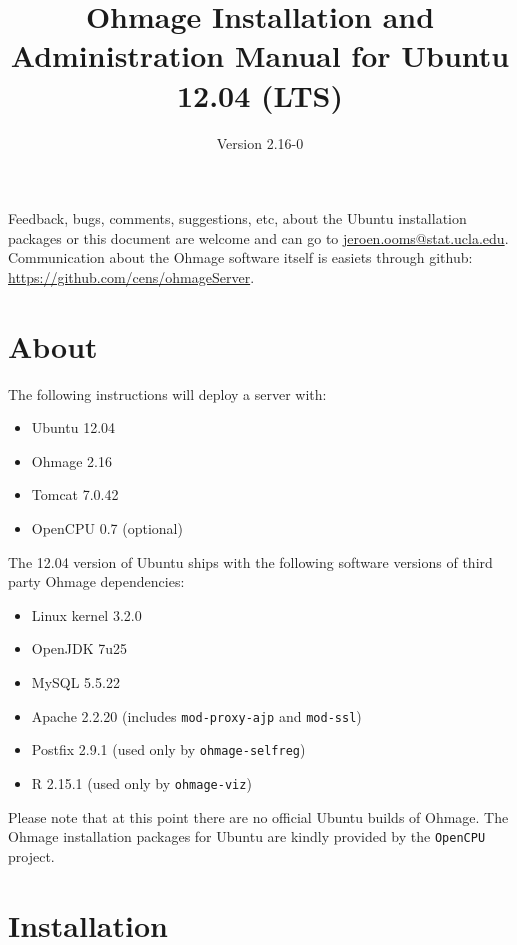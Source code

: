 \documentclass{scrartcl}
\title{Ohmage Installation and Administration Manual for Ubuntu 12.04 (LTS)}
\subtitle{Version 2.16-0}
\begin{document}
\maketitle

\noindent Feedback, bugs, comments, suggestions, etc, about the Ubuntu
installation packages or this document are welcome and can go to
\href{mailto:jeroen.ooms@stat.ucla.edu}{jeroen.ooms@stat.ucla.edu}.
Communication about the Ohmage software itself is easiets through github:
\href{https://github.com/cens/ohmageServer}{https://github.com/cens/ohmageServer}.


\section*{About}

The following instructions will deploy a server with:

\begin{itemize}
  \item Ubuntu 12.04
  \item Ohmage 2.16
  \item Tomcat 7.0.42
  \item OpenCPU 0.7 (optional)
\end{itemize}

\noindent The 12.04 version of Ubuntu ships with the following
software versions of third party Ohmage dependencies:

\begin{itemize}
  \item Linux kernel 3.2.0
  \item OpenJDK 7u25
  \item MySQL 5.5.22
  \item Apache 2.2.20 (includes \texttt{mod-proxy-ajp} and \texttt{mod-ssl})
  \item Postfix 2.9.1 (used only by \texttt{ohmage-selfreg})
  \item R 2.15.1 (used only by \texttt{ohmage-viz})
\end{itemize}

\noindent Please note that at this point there are no official Ubuntu builds of
Ohmage. The Ohmage installation packages for Ubuntu are kindly provided by the
\texttt{OpenCPU} project.



\section{Installation}
\end{document}
